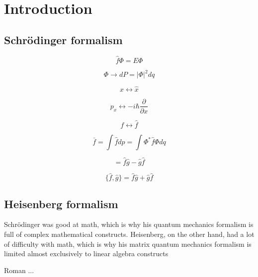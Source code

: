 \section{Introduction}
	\subsection{Schr\"odinger formalism}
	
		\begin{equation}
			\hat{f}\Phi =  E \Phi
		\end{equation}
	
		\begin{equation}
			\Phi \rightarrow dP = |\Phi|^2dq
		\end{equation}
		
		\begin{equation}
			x \leftrightarrow \hat{x}
		\end{equation}

		\begin{equation}
			p_x \leftrightarrow -i\hbar \frac{\partial}{\partial x}
		\end{equation}
	
		\begin{equation}
			f \leftrightarrow \hat{f}
		\end{equation}	
		
		\begin{equation}
			\bar{f} = \int \hat{f}dp = \int \Phi^* \hat{f} \Phi dq 
		\end{equation}
		
		\begin{equation}
			[\hat{f}, \hat{g}] = \hat{f}\hat{g} - \hat{g}\hat{f}
		\end{equation}

		\begin{equation}
		\{\hat{f}, \hat{g}\} = \hat{f}\hat{g} + \hat{g}\hat{f}
		\end{equation}
		
		\cite{sakurai2014modern}
	
	\subsection{Heisenberg formalism}
		\epigraph{Schr\"odinger was good at math, which is why his quantum mechanics formalism is full of complex mathematical constructs. Heisenberg, on the other hand, had a lot of difficulty with math, which is why his matrix quantum mechanics formalism is limited almost exclusively to linear algebra constructs}{Roman ... }
	
